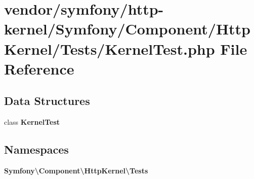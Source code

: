\section{vendor/symfony/http-\/kernel/\+Symfony/\+Component/\+Http\+Kernel/\+Tests/\+Kernel\+Test.php File Reference}
\label{_kernel_test_8php}
\subsection*{Data Structures}
\begin{DoxyCompactItemize}
\item 
class {\bf Kernel\+Test}
\end{DoxyCompactItemize}
\subsection*{Namespaces}
\begin{DoxyCompactItemize}
\item 
 {\bf Symfony\textbackslash{}\+Component\textbackslash{}\+Http\+Kernel\textbackslash{}\+Tests}
\end{DoxyCompactItemize}
